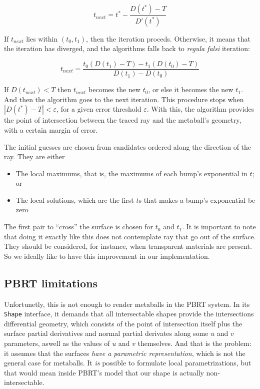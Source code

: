 \documentclass[conference]{acmsiggraph}
\begin{document}
\begin{equation}
  t_{next} = t^* - \frac{D(t^*) - T}{D'(t^*)}
\end{equation}

If $t_{next}$ lies within $(t_0, t_1)$, then the iteration proceds. Otherwise,
it means that the iteration has diverged, and the algorithms falls back to
\textit{regula falsi} iteration:

\begin{equation}
  t_{next} = \frac{t_0(D(t_1) - T) - t_1(D(t_0) - T)}{D(t_1) - D(t_0)}
\end{equation}

If $D(t_{next}) < T$ then $t_{next}$ becomes the new $t_0$, or else it becomes the
new $t_1$. And then the algorithm goes to the next iteration. This procedure
stops when $|D(t^*) - T| < \varepsilon$, for a given error threshold $\varepsilon$.
With this, the algorithm provides the point of intersection between the traced ray
and the metaball's geometry, with a certain margin of error.

The initial guesses are chosen from candidates ordered along the direction of
the ray. They are either

\begin{itemize}
  \item The local maximums, that is, the maximums of each bump's exponential in $t$; or
  \item The local solutions, which are the first $t$s that makes a bump's
        exponential be zero
\end{itemize}
 
The first pair to ``cross'' the surface is chosen for $t_0$ and $t_1$. It is
important to note that doing it exactly like this does not contemplate ray that
go out of the surface. They should be considered, for instance, when transparent
materials are present. So we ideally like to have this improvement in our
implementation.

\subsection{PBRT limitations}

Unfortunetly, this is not enough to render metaballs in the PBRT system. In its
\texttt{Shape} interface, it demands that all intersectable shapes provide the
intersections differential geometry, which consists of the point of intersection
itself plus the surface partial derivatives and normal partial derivates along
some $u$ and $v$ parameters, aswell as the values of $u$ and $v$ themselves. And
that is the problem: it assumes that the surfaces \textit{have a parametric
representation}, which is not the general case for metaballs. It \textit{is}
possible to formulate local parametrizations, but that would mean inside PBRT's
model that our shape is actually non-intersectable.
\end{document}
